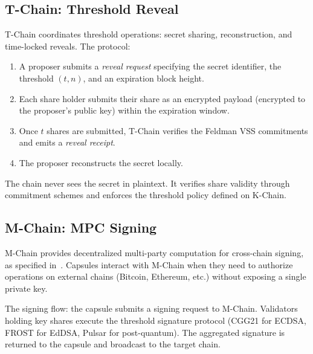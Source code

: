 \subsection{T-Chain: Threshold Reveal}\label{sec:tchain}

T-Chain coordinates threshold operations: secret sharing, reconstruction, and
time-locked reveals. The protocol:

\begin{enumerate}[nosep]
  \item A proposer submits a \textit{reveal request} specifying the secret
        identifier, the threshold $(t, n)$, and an expiration block height.
  \item Each share holder submits their share as an encrypted payload
        (encrypted to the proposer's public key) within the expiration window.
  \item Once $t$ shares are submitted, T-Chain verifies the Feldman VSS
        commitments and emits a \textit{reveal receipt}.
  \item The proposer reconstructs the secret locally.
\end{enumerate}

The chain never sees the secret in plaintext. It verifies share validity
through commitment schemes and enforces the threshold policy defined on K-Chain.

\subsection{M-Chain: MPC Signing}\label{sec:mchain}

M-Chain provides decentralized multi-party computation for cross-chain signing,
as specified in~\cite{lux-mchain-mpc}. Capsules interact with M-Chain when they
need to authorize operations on external chains (Bitcoin, Ethereum, etc.) without
exposing a single private key.

The signing flow: the capsule submits a signing request to M-Chain. Validators
holding key shares execute the threshold signature protocol (CGG21 for ECDSA,
FROST for EdDSA, Pulsar for post-quantum). The aggregated signature is
returned to the capsule and broadcast to the target chain.

